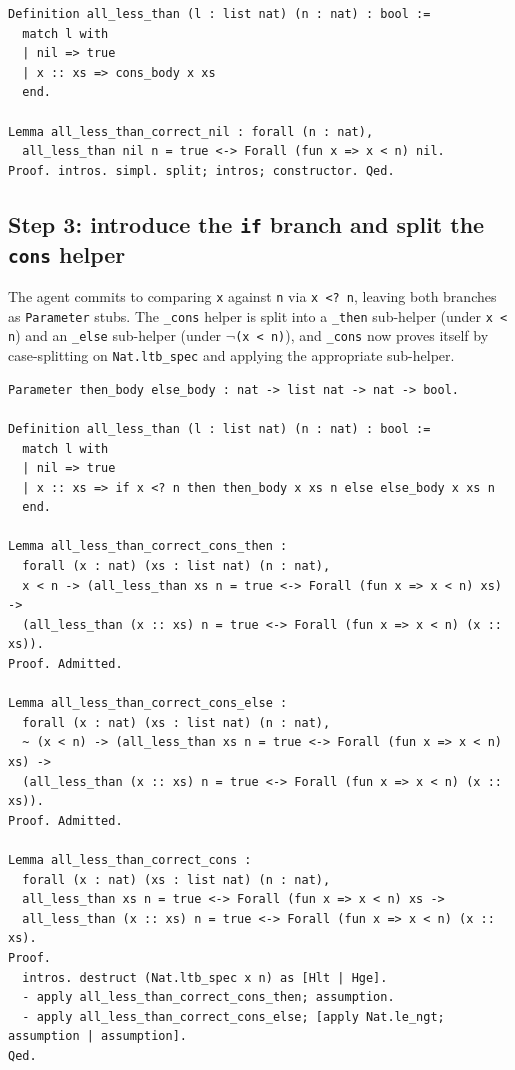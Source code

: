 \begin{lstlisting}
Definition all_less_than (l : list nat) (n : nat) : bool :=
  match l with
  | nil => true
  | x :: xs => cons_body x xs
  end.

Lemma all_less_than_correct_nil : forall (n : nat),
  all_less_than nil n = true <-> Forall (fun x => x < n) nil.
Proof. intros. simpl. split; intros; constructor. Qed.
\end{lstlisting}

\subsection{Step 3: introduce the \texttt{if} branch and split the \texttt{cons} helper}
The agent commits to comparing \texttt{x} against \texttt{n} via \texttt{x <? n}, leaving both branches as \texttt{Parameter} stubs. The \texttt{\_cons} helper is split into a \texttt{\_then} sub-helper (under \texttt{x < n}) and an \texttt{\_else} sub-helper (under \texttt{$\neg$(x < n)}), and \texttt{\_cons} now proves itself by case-splitting on \texttt{Nat.ltb\_spec} and applying the appropriate sub-helper.

\begin{lstlisting}
Parameter then_body else_body : nat -> list nat -> nat -> bool.

Definition all_less_than (l : list nat) (n : nat) : bool :=
  match l with
  | nil => true
  | x :: xs => if x <? n then then_body x xs n else else_body x xs n
  end.

Lemma all_less_than_correct_cons_then :
  forall (x : nat) (xs : list nat) (n : nat),
  x < n -> (all_less_than xs n = true <-> Forall (fun x => x < n) xs) ->
  (all_less_than (x :: xs) n = true <-> Forall (fun x => x < n) (x :: xs)).
Proof. Admitted.

Lemma all_less_than_correct_cons_else :
  forall (x : nat) (xs : list nat) (n : nat),
  ~ (x < n) -> (all_less_than xs n = true <-> Forall (fun x => x < n) xs) ->
  (all_less_than (x :: xs) n = true <-> Forall (fun x => x < n) (x :: xs)).
Proof. Admitted.

Lemma all_less_than_correct_cons :
  forall (x : nat) (xs : list nat) (n : nat),
  all_less_than xs n = true <-> Forall (fun x => x < n) xs ->
  all_less_than (x :: xs) n = true <-> Forall (fun x => x < n) (x :: xs).
Proof.
  intros. destruct (Nat.ltb_spec x n) as [Hlt | Hge].
  - apply all_less_than_correct_cons_then; assumption.
  - apply all_less_than_correct_cons_else; [apply Nat.le_ngt; assumption | assumption].
Qed.
\end{lstlisting}

